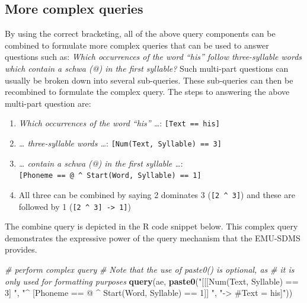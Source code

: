 \documentclass[]{book}
\newenvironment{Shaded}{\begin{snugshade}}{\end{snugshade}}
\newcommand{\CommentTok}[1]{\textcolor[rgb]{0.56,0.35,0.01}{\textit{#1}}}
\newcommand{\KeywordTok}[1]{\textcolor[rgb]{0.13,0.29,0.53}{\textbf{#1}}}
\newcommand{\NormalTok}[1]{#1}
\newcommand{\StringTok}[1]{\textcolor[rgb]{0.31,0.60,0.02}{#1}}
\providecommand{\tightlist}{%
  \setlength{\itemsep}{0pt}\setlength{\parskip}{0pt}}
\begin{document}
\hypertarget{subsec:query-moreComplexQueries}{%
\subsection{More complex queries}\label{subsec:query-moreComplexQueries}}

By using the correct bracketing, all of the above query components can be combined to formulate more complex queries that can be used to answer questions such as: \emph{Which occurrences of the word ``his'' follow three-syllable words which contain a schwa (@) in the first syllable?} Such multi-part questions can usually be broken down into several sub-queries. These sub-queries can then be recombined to formulate the complex query. The steps to answering the above multi-part question are:

\begin{enumerate}
\def\labelenumi{\arabic{enumi}.}
\tightlist
\item
  \emph{Which occurrences of the word ``his'' \ldots{}}: \texttt{{[}Text\ ==\ his{]}}
\item
  \emph{\ldots{} three-syllable words \ldots{}}: \texttt{{[}Num(Text,\ Syllable)\ ==\ 3{]}}
\item
  \emph{\ldots{} contain a schwa (@) in the first syllable \ldots{}}: \texttt{{[}Phoneme\ ==\ @\ \^{}\ Start(Word,\ Syllable)\ ==\ 1{]}}
\item
  All three can be combined by saying 2 dominates 3 (\texttt{{[}2\ \^{}\ 3{]}}) and these are followed by 1 (\texttt{{[}2\ \^{}\ 3{]}\ -\textgreater{}\ 1{]}})
\end{enumerate}

The combine query is depicted in the R code snippet below. This complex query demonstrates the expressive power of the query mechanism that the EMU-SDMS provides.

\begin{Shaded}
\begin{Highlighting}[]
\CommentTok{# perform complex query}
\CommentTok{# Note that the use of paste0() is optional, as}
\CommentTok{# it is only used for formatting purposes}
\KeywordTok{query}\NormalTok{(ae, }\KeywordTok{paste0}\NormalTok{(}\StringTok{"[[[Num(Text, Syllable) == 3] "}\NormalTok{,}
                 \StringTok{"^ [Phoneme == @ ^ Start(Word, Syllable) == 1]] "}\NormalTok{,}
                 \StringTok{"-> #Text = his]"}\NormalTok{))}
\end{Highlighting}
\end{Shaded}
\end{document}
